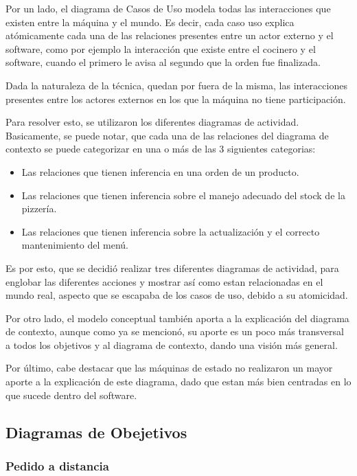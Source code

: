 \documentclass[a4paper,10pt]{article}
\begin{document}
Por un lado, el diagrama de Casos de Uso modela todas las interacciones que existen entre la m\'aquina y el mundo. Es decir, cada caso uso explica
at\'omicamente cada una de las relaciones presentes entre un actor externo y el software, como por ejemplo la interacci\'on que existe entre
el cocinero y el software, cuando el primero le avisa al segundo que la orden fue finalizada. 

Dada la naturaleza de la t\'ecnica, quedan por fuera de la misma, las interacciones presentes entre los actores externos en los que la m\'aquina
no tiene participaci\'on. 

Para resolver esto, se utilizaron los diferentes diagramas de actividad. Basicamente, se puede notar, que cada una de las relaciones del diagrama de
contexto se puede categorizar en una o m\'as de las 3 siguientes categorias:
\begin{itemize}
\item Las relaciones que tienen inferencia en una orden de un producto.
\item Las relaciones que tienen inferencia sobre el manejo adecuado del stock de la pizzer\'ia.
\item Las relaciones que tienen inferencia sobre la actualizaci\'on y el correcto mantenimiento del men\'u.
\end{itemize}

Es por esto, que se decidi\'o realizar tres diferentes diagramas de actividad, para englobar las diferentes acciones y mostrar as\'i como 
estan relacionadas en el mundo real, aspecto que se escapaba de los casos de uso, debido a su atomicidad.



Por otro lado, el modelo conceptual tambi\'en aporta a la explicaci\'on del diagrama de contexto, aunque como ya se mencion\'o, su aporte
es un poco m\'as transversal a todos los objetivos y al diagrama de contexto, dando una visi\'on m\'as general.


Por \'ultimo, cabe destacar que las m\'aquinas de estado no realizaron un mayor aporte a la explicaci\'on de este diagrama, dado que estan m\'as bien
centradas en lo que sucede dentro del software.

\subsection*{Diagramas de Obejetivos}

\subsubsection*{Pedido a distancia}
\end{document}
